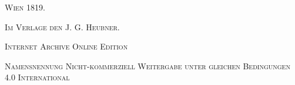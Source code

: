 \documentclass[a4paper, 11pt, oneside, polutonikogreek, german]{article}
\begin{document}
\begin{titlepage}
    \vspace*{\fill}

	\vspace{1\baselineskip}

	{\small\scshape Wien 1819.}
	
	{\small\scshape{Im Verlage den J. G. Heubner.}}
	
	\vspace{0.5\baselineskip} %

    \scshape Internet Archive Online Edition  %
	
	{\scshape\small Namensnennung Nicht-kommerziell Weitergabe unter gleichen Bedingungen 4.0 International} %
\end{titlepage}
\setlength{\parskip}{1mm plus1mm minus1mm}
\clearpage
\pagestyle{fancy}
\fancyhf{}
\cfoot{\swabfamily{\thepage}}
\tableofcontents
\clearpage
\LARGE
\section*{}
\end{document}
